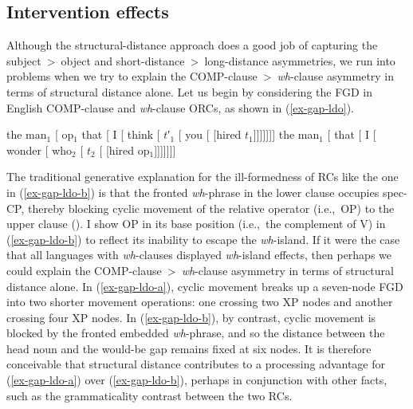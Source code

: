 \subsection{Intervention effects}\label{gap-intervention}

Although the structural-distance approach does a good job of capturing the subject~>~object and short-distance~>~long-distance asymmetries, we run into problems when we try to explain the COMP-clause~>~\textit{wh}-clause asymmetry in terms of structural distance alone. Let us begin by considering the FGD in English COMP-clause and \textit{wh}-clause ORCs, as shown in (\ref{ex-gap-ldo}).

\pex \label{ex-gap-ldo}
\a the man$_1$ [ {\sc op}$_1$ that [ I [ think [ $t$′$_1$ [ you [ [hired $t_1$]]]]]]]\label{ex-gap-ldo-a}
\a \ljudge*the man$_1$ [ that [ I [ wonder [ who$_2$ [ $t_2$ [ [hired {\sc op}$_1$]]]]]]]\label{ex-gap-ldo-b}
\xe

The traditional generative explanation for the ill-formedness of RCs like the one in (\ref{ex-gap-ldo-b}) is that the fronted \textit{wh}-phrase in the lower clause occupies spec-CP, thereby blocking cyclic movement of the relative operator (i.e.,~OP) to the upper clause (\cite{chomsky1973,chomsky1977,chomsky1986,chomsky2000,chomsky2001,ishii2000}). I show OP in its base position (i.e.,~the complement of V) in (\ref{ex-gap-ldo-b}) to reflect its inability to escape the \textit{wh}-island. If it were the case that all languages with \textit{wh}-clauses displayed \textit{wh}-island effects, then perhaps we could explain the COMP-clause~>~\textit{wh}-clause asymmetry in terms of structural distance alone. In (\ref{ex-gap-ldo-a}), cyclic movement breaks up a seven-node FGD into two shorter movement operations: one crossing two XP nodes and another crossing four XP nodes. In (\ref{ex-gap-ldo-b}), by contrast, cyclic movement is blocked by the fronted embedded \textit{wh}-phrase, and so the distance between the head noun and the would-be gap remains fixed at six nodes. It is therefore conceivable that structural distance contributes to a processing advantage for (\ref{ex-gap-ldo-a}) over (\ref{ex-gap-ldo-b}), perhaps in conjunction with other facts, such as the grammaticality contrast between the two RCs.

